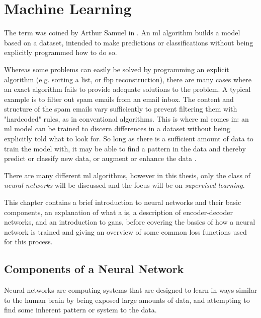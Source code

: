 \chapter{Machine Learning}
\label{sec:ml}
The term  was coined by Arthur Samuel in \citeyear{samuelmachinelearning} \cite{samuelmachinelearning}. An \gls{ml} algorithm builds a model based on a dataset, intended to make predictions or classifications without being explicitly programmed how to do so. 

Whereas some problems can easily be solved by programming an explicit algorithm (e.g. sorting a list, or \gls{fbp} reconstruction), there are many cases where an exact algorithm fails to provide adequate solutions to the problem. A typical example is to filter out spam emails from an email inbox. The content and structure of the spam emails vary sufficiently to prevent filtering them with "hardcoded" rules, as in conventional algorithms. This is where \gls{ml} comes in: an \gls{ml} model can be trained to discern differences in a dataset without being explicitly told what to look for. So long as there is a sufficient amount of data to train the model with, it may be able to find a pattern in the data and thereby predict or classify new data, or augment or enhance the data \cite[2-4]{Alpaydin10}. 

There are many different \gls{ml} algorithms, however in this thesis, only the class of \textit{neural networks} will be discussed and the focus will be on \textit{supervised learning}. 

This chapter contains a brief introduction to neural networks and their basic components, an explanation of what a  is, a description of encoder-decoder networks, and an introduction to \glspl{gan}, before covering the basics of how a neural network is trained and giving an overview of some common loss functions used for this process. 

\section{Components of a Neural Network}
\label{sec:ml:componentsofaneuralnetwork}
Neural networks are computing systems that are designed to learn in ways similar to the human brain by being exposed large amounts of data, and attempting to find some inherent pattern or system to the data. 

